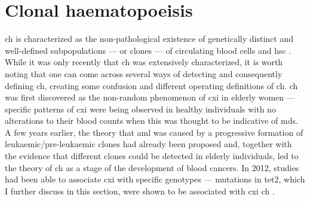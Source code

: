 \section{Clonal haematopoeisis}

\Ac{ch} is characterized as the non-pathological existence of genetically distinct and well-defined subpopulations --- or clones --- of circulating blood cells and \ac{hsc} \cite{Jan2017-rc}. While it was only recently that \ac{ch} was extensively characterized, it is worth noting that one can come across several ways of detecting and consequently defining \ac{ch}, creating some confusion and different operating definitions of \ac{ch}. \Ac{ch} was first discovered as the non-random phenomenon of \ac{cxi} in elderly women \cite{Busque1996-ek,Champion1997-fj} --- specific patterns of \ac{cxi} were being observed in healthy individuals with no alterations to their blood counts when this was thought to be indicative of \ac{mds}. A few years earlier, the theory that \ac{aml} was caused by a progressive formation of leukaemic/pre-leukaemic clones had already been proposed \cite{Fialkow1991-de} and, together with the evidence that different clones could be detected in elderly individuals, led to the theory of \ac{ch} as a stage of the development of blood cancers. In 2012, studies had been able to associate \ac{cxi} with specific genotypes --- mutations in \ac{tet2}, which I further discuss in this section, were shown to be associated with \ac{cxi} \ac{ch} \cite{Busque2012-oc}. 

